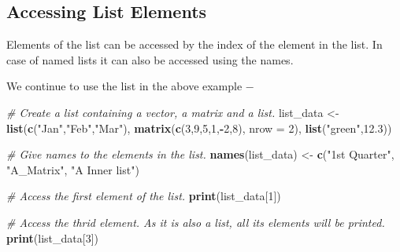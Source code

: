 \documentclass[]{book}
\newenvironment{Shaded}{\begin{snugshade}}{\end{snugshade}}
\newcommand{\CommentTok}[1]{\textcolor[rgb]{0.56,0.35,0.01}{\textit{#1}}}
\newcommand{\DataTypeTok}[1]{\textcolor[rgb]{0.13,0.29,0.53}{#1}}
\newcommand{\DecValTok}[1]{\textcolor[rgb]{0.00,0.00,0.81}{#1}}
\newcommand{\FloatTok}[1]{\textcolor[rgb]{0.00,0.00,0.81}{#1}}
\newcommand{\KeywordTok}[1]{\textcolor[rgb]{0.13,0.29,0.53}{\textbf{#1}}}
\newcommand{\NormalTok}[1]{#1}
\newcommand{\OperatorTok}[1]{\textcolor[rgb]{0.81,0.36,0.00}{\textbf{#1}}}
\newcommand{\StringTok}[1]{\textcolor[rgb]{0.31,0.60,0.02}{#1}}
\theoremstyle{definition}
\theoremstyle{definition}
\theoremstyle{definition}
\theoremstyle{remark}
\begin{document}
\hypertarget{accessing-list-elements}{%
\subsection{Accessing List Elements}\label{accessing-list-elements}}

Elements of the list can be accessed by the index of the element in the
list. In case of named lists it can also be accessed using the names.

We continue to use the list in the above example −

\begin{Shaded}
\begin{Highlighting}[]
\CommentTok{# Create a list containing a vector, a matrix and a list.}
\NormalTok{list_data <-}\StringTok{ }\KeywordTok{list}\NormalTok{(}\KeywordTok{c}\NormalTok{(}\StringTok{"Jan"}\NormalTok{,}\StringTok{"Feb"}\NormalTok{,}\StringTok{"Mar"}\NormalTok{), }\KeywordTok{matrix}\NormalTok{(}\KeywordTok{c}\NormalTok{(}\DecValTok{3}\NormalTok{,}\DecValTok{9}\NormalTok{,}\DecValTok{5}\NormalTok{,}\DecValTok{1}\NormalTok{,}\OperatorTok{-}\DecValTok{2}\NormalTok{,}\DecValTok{8}\NormalTok{), }\DataTypeTok{nrow =} \DecValTok{2}\NormalTok{),}
   \KeywordTok{list}\NormalTok{(}\StringTok{"green"}\NormalTok{,}\FloatTok{12.3}\NormalTok{))}

\CommentTok{# Give names to the elements in the list.}
\KeywordTok{names}\NormalTok{(list_data) <-}\StringTok{ }\KeywordTok{c}\NormalTok{(}\StringTok{"1st Quarter"}\NormalTok{, }\StringTok{"A_Matrix"}\NormalTok{, }\StringTok{"A Inner list"}\NormalTok{)}

\CommentTok{# Access the first element of the list.}
\KeywordTok{print}\NormalTok{(list_data[}\DecValTok{1}\NormalTok{])}
\end{Highlighting}
\end{Shaded}

\begin{Shaded}
\begin{Highlighting}[]
\CommentTok{# Access the thrid element. As it is also a list, all its elements will be printed.}
\KeywordTok{print}\NormalTok{(list_data[}\DecValTok{3}\NormalTok{])}
\end{Highlighting}
\end{Shaded}

\begin{Shaded}
\end{Shaded}
\end{document}
